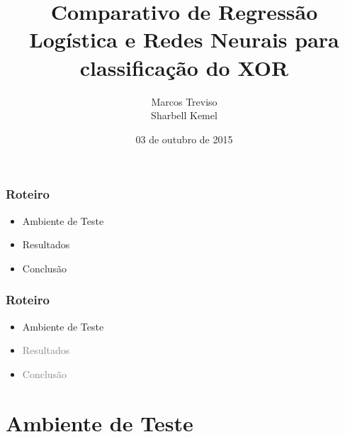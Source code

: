 \documentclass[10pt]{beamer}
\title{Comparativo de Regressão Logística e Redes Neurais para classificação do XOR}
\subtitle{}
\date{03 de outubro de 2015}
\author[Treviso]{Marcos Treviso\\Sharbell Kemel\\}
\institute{Aprendizado de Máquina - Universidade Federal do Pampa}
\begin{document}
\maketitle


\begin{frame}
  \frametitle{Roteiro}

  \begin{itemize}

    \item Ambiente de Teste

    \item Resultados

    \item Conclusão

  \end{itemize}

\end{frame}



\begin{frame}
  \frametitle{Roteiro}

  \begin{itemize}

    \item Ambiente de Teste

    \item[\color{gray}{$\bullet$}] \textcolor{gray}{Resultados}

    \item[\color{gray}{$\bullet$}] \textcolor{gray}{Conclusão}

  \end{itemize}

\end{frame}



\section{Ambiente de Teste}
\end{document}
